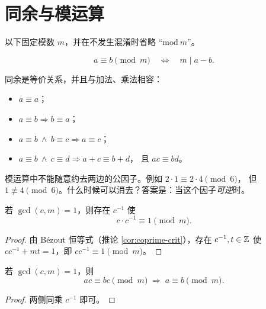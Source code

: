 \section{同余与模运算}\label{sec:cong}

以下固定模数 $m$，并在不发生混淆时省略 “$\mathrm{mod}\ m$”。

\begin{definition}[同余]
\[
  a\equiv b\pmod m \quad\Longleftrightarrow\quad m\mid a-b.
\]
\end{definition}

同余是等价关系，并且与加法、乘法相容：
\begin{itemize}[leftmargin=1.3em,itemsep=1pt]
  \item $a\equiv a$；
  \item $a\equiv b \Rightarrow b\equiv a$；
  \item $a\equiv b\ \wedge\ b\equiv c \Rightarrow a\equiv c$；
  \item $a\equiv b\ \wedge\ c\equiv d \Rightarrow a+c\equiv b+d$，
        且 $ac\equiv bd$。
\end{itemize}

模运算中不能随意约去两边的公因子。例如 $2\cdot1\equiv2\cdot4\pmod 6$，
但 $1\not\equiv4\pmod 6$。什么时候可以消去？答案是：当这个因子\emph{可逆}时。

\begin{theorem}[逆元的存在性]\label{thm:inverse}
若 $\gcd(c,m)=1$，则存在 $c^{-1}$ 使
\[
  c\cdot c^{-1}\equiv1\pmod m.
\]
\end{theorem}

\begin{proof}
由 Bézout 恒等式（推论 \ref{cor:coprime-crit}），存在 $c^{-1},t\in\mathbb{Z}$ 使
$cc^{-1}+mt=1$，即 $cc^{-1}\equiv1\pmod m$。
\end{proof}

\begin{corollary}[消去律]
若 $\gcd(c,m)=1$，则
\[
  ac\equiv bc\pmod m \;\Longrightarrow\; a\equiv b\pmod m.
\]
\end{corollary}

\begin{proof}
两侧同乘 $c^{-1}$ 即可。
\end{proof}
